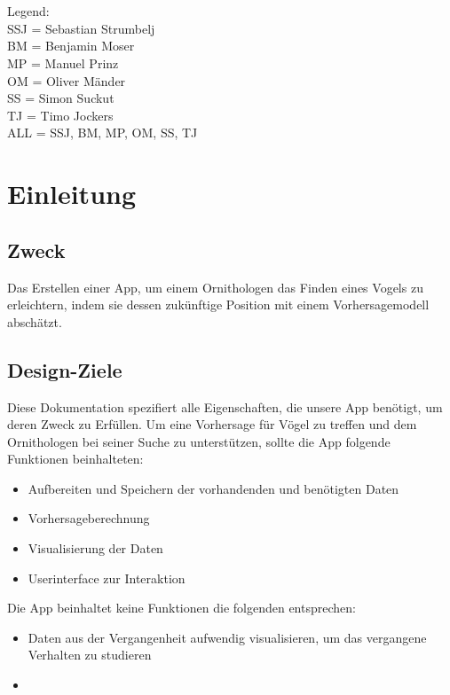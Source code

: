 \documentclass[12pt]{article} %
\begin{document}
{\small

\noindent
\\\\Legend: \\
SSJ = Sebastian Strumbelj \\
BM = Benjamin Moser \\
MP = Manuel Prinz \\
OM = Oliver Mänder \\
SS = Simon Suckut \\
TJ = Timo Jockers \\
ALL = SSJ, BM, MP, OM, SS, TJ \\
}



\section{Einleitung} %


\subsection{Zweck}
Das Erstellen einer App, um einem Ornithologen das Finden eines Vogels zu erleichtern, indem sie dessen zukünftige Position mit einem Vorhersagemodell abschätzt. 


\subsection{Design-Ziele}

Diese Dokumentation spezifiert alle Eigenschaften, die unsere App benötigt, um deren Zweck zu Erfüllen. Um eine Vorhersage für Vögel zu treffen und dem Ornithologen bei seiner Suche zu unterstützen, sollte die App folgende Funktionen beinhalteten: 
\begin{itemize}
	\item Aufbereiten und Speichern der vorhandenden und benötigten Daten
	\item Vorhersageberechnung 
	\item Visualisierung der Daten
	\item Userinterface zur Interaktion 
\end{itemize}
Die App beinhaltet keine Funktionen die folgenden entsprechen:
\begin{itemize}
	\item Daten aus der Vergangenheit aufwendig visualisieren, um das vergangene Verhalten zu studieren
	\item \color{red}{TODO}

\end{itemize}
\end{document}
